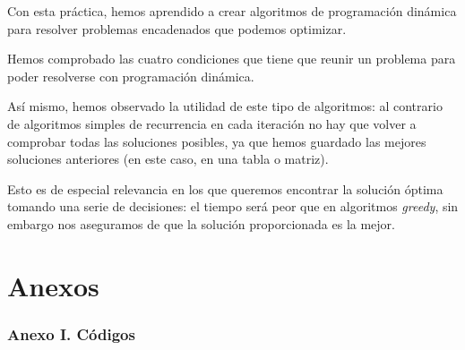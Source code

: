\documentclass[10pt, a4paper]{article}
\theoremstyle{theorem-style}
\theoremstyle{theorem-style}
\theoremstyle{definition-style}
\theoremstyle{remark-style}
\theoremstyle{example-style}
\theoremstyle{definition-style}
\theoremstyle{remark-style}
\begin{document}
Con esta práctica, hemos aprendido a crear algoritmos de programación dinámica para resolver problemas encadenados que podemos optimizar. 

Hemos comprobado las cuatro condiciones que tiene que reunir un problema para poder resolverse con programación dinámica. 

Así mismo, hemos observado la utilidad de este tipo de algoritmos: al contrario de algoritmos simples de recurrencia en cada iteración no hay que volver a comprobar todas las soluciones posibles, ya que hemos guardado las mejores soluciones anteriores (en este caso, en una tabla o matriz).

Esto es de especial relevancia en los que queremos encontrar la solución óptima tomando una serie de decisiones: el tiempo será peor que en algoritmos \emph{greedy}, sin embargo nos aseguramos de que la solución proporcionada es la mejor.


\pagebreak

\part{Anexos}

\section*{Anexo I. Códigos}
\end{document}
